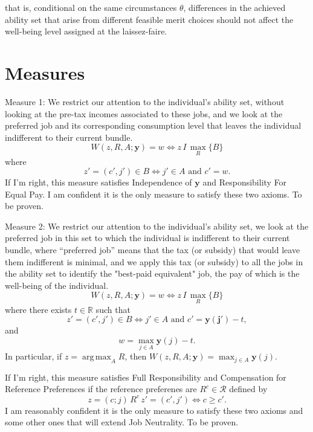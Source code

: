 \documentclass[12pt]{article}
\DeclareMathOperator*{\argmax}{arg\,max}
\begin{document}
that is, conditional on the same circumstances $\theta$, differences in the achieved ability set that arise from different feasible merit choices should not affect the well-being level assigned at the laissez-faire.



\section{Measures}

Measure 1: We restrict our attention to the individual's ability set, without looking at the pre-tax incomes associated to these jobs, and we look at the preferred job and its corresponding consumption level that leaves the individual indifferent to their current bundle.
\begin{equation*}
\label{ }
W(z, R, A;\mathbf{y})=w\Leftrightarrow z\,I\,\max_R\{B\}
\end{equation*}
where
\begin{equation*}
\label{ }
z'=(c',j')\in B\Leftrightarrow j'\in A \textrm{ and } c'=w.
\end{equation*}
If I'm right, this measure satisfies Independence of $\mathbf{y}$ and Responsibility For Equal Pay. I am confident it is the only measure to satisfy these two axioms. To be proven.

Measure 2: We restrict our attention to the individual's ability set, we look at the preferred job in this set to which the individual is indifferent to their current bundle, where ``preferred job'' means that the tax (or subsidy) that would leave them indifferent is minimal, and we apply this tax (or subsidy) to all the jobs in the ability set to identify the "best-paid equivalent" job, the pay of which is the well-being of the individual.
\begin{equation*}
\label{ }
W(z, R, A;\mathbf{y})=w\Leftrightarrow z\,I\,\max_R\{B\}
\end{equation*}
where there exists $t\in\mathbb{R}$ such that 
\begin{equation*}
\label{ }
z'=(c',j')\in B\Leftrightarrow j'\in A \textrm{ and } c'=\mathbf{y(j')}-t,
\end{equation*}
and 
\begin{equation*}
\label{ }
w=\max_{j\in A}\mathbf{y}(j)-t.
\end{equation*}
In particular, if $z=\argmax_A R$, then $W(z, R, A;\mathbf{y})=\max_{j\in A}\mathbf{y}(j)$.

If I'm right, this measure satisfies Full Responsibility and Compensation for Reference Preferences if the reference preferenes are $R^{c}\in\mathcal{R}$ defined by 
\begin{equation*}
\label{ }
z=(c;j)\,R^{c}\,z'=(c',j')\Leftrightarrow c\geq c'.
\end{equation*} 
I am reasonably confident it is the only measure to satisfy these two axioms and some other ones that will extend Job Neutrality. To be proven.
\end{document}

